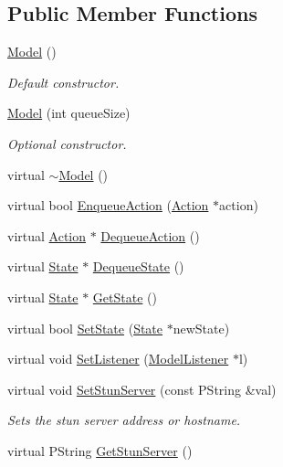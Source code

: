 \subsection*{Public Member Functions}
\begin{CompactItemize}
\item 
\hyperlink{classModel_e3b375de5f6df4faf74a95d64748e048}{Model} ()
\begin{CompactList}\small\item\em Default constructor. \item\end{CompactList}\item 
\hyperlink{classModel_0dfa7627123dd65d7593b72cf03901f9}{Model} (int queueSize)
\begin{CompactList}\small\item\em Optional constructor. \item\end{CompactList}\item 
virtual \hyperlink{classModel_d6ebd2062a0b823db841a0b88baac4c0}{$\sim$Model} ()
\item 
virtual bool \hyperlink{classModel_1273906325b572fe38cc3c74c8f0f831}{EnqueueAction} (\hyperlink{classAction}{Action} $\ast$action)
\item 
virtual \hyperlink{classAction}{Action} $\ast$ \hyperlink{classModel_49c672e91b844a13b8cbee1d2382a5b4}{DequeueAction} ()
\item 
virtual \hyperlink{classState}{State} $\ast$ \hyperlink{classModel_a92abd0332df9f768033423b0cd8b3ae}{DequeueState} ()
\item 
virtual \hyperlink{classState}{State} $\ast$ \hyperlink{classModel_aca96bcd2e019aad9c4d4d7203b77cce}{GetState} ()
\item 
virtual bool \hyperlink{classModel_8b2d324213cf67b2e139144a25c6e3c3}{SetState} (\hyperlink{classState}{State} $\ast$newState)
\item 
virtual void \hyperlink{classModel_dca495055a5153c982891398d016e22d}{SetListener} (\hyperlink{classModelListener}{ModelListener} $\ast$l)
\item 
virtual void \hyperlink{classModel_d45dc4b460f571d748905f1c19e88577}{SetStunServer} (const PString \&val)
\begin{CompactList}\small\item\em Sets the stun server address or hostname. \item\end{CompactList}\item 
virtual PString \hyperlink{classModel_8011462d91a258e49920db3b157c7af6}{GetStunServer} ()

\end{CompactItemize}
